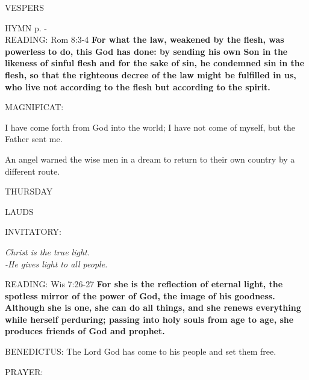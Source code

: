 \begin{flushleft}\normalsize{\uppercase{VESPERS\\}}\end{flushleft}
\small{\uppercase{HYMN} p. \pageref{christmas:firstHymn}-\pageref{christmas:lastHymn}\\}
\noindent\small{\uppercase{READING:}}    Rom 8:3-4 \textbf{   For what the law, weakened by the flesh, was powerless to do, this God has done: by sending his own Son in the likeness of sinful flesh and for the sake of sin, he condemned sin in the flesh, so that the righteous decree of the law might be fulfilled in us, who live not according to the flesh but according to the spirit.\\}

\noindent\small{\uppercase{MAGNIFICAT:}}\begin{description}[labelindent=\parindent, leftmargin=*]
\item [(before the Epiphany)] I have come forth from God into the world; I have not come of myself, but the Father sent me.
\item [(Friday after the Epiphany)] An angel warned the wise men in a dream to return to their own country by a different route.
\end{description}

\begin{center}
\normalsize THURSDAY
\end{center}

\begin{flushleft}\normalsize{\uppercase{LAUDS\\}}\end{flushleft}
\small{\uppercase{INVITATORY:}}\normalsize
\begin{center}
\textit{Christ is the true light.\\}
\textit{-He gives light to all people.\\}
\end{center}
\noindent\small{\uppercase{READING:}}    Wis 7:26-27 \textbf{   For she is the reflection of eternal light, the spotless mirror of the power of God, the image of his goodness. Although she is one, she can do all things, and she renews everything while herself perduring; passing into holy souls from age to age, she produces friends of God and prophet.\\}

\noindent\small{\uppercase{BENEDICTUS:}}	The Lord God has come to his people and set them free.

\noindent\small{\uppercase{PRAYER:}}	

